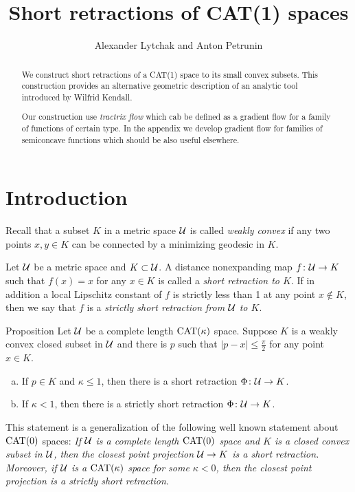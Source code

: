 \documentclass[oneside,a4paper, 12pt]{article}
\begin{document}
\title{Short retractions of CAT(1) spaces}
\author{Alexander Lytchak and Anton Petrunin}
\date{}
\maketitle

\begin{abstract}
We construct short retractions of a CAT(1) space to its small convex subsets.
This construction provides an alternative geometric description of an analytic tool introduced by Wilfrid Kendall.

Our construction use \emph{tractrix flow} which cab be defined as a gradient flow for a family of functions of certain type.
In the appendix we develop gradient flow for families of semiconcave functions which should be also useful elsewhere.
\end{abstract}


\section{Introduction}


Recall that a  subset $K$ in a metric space ${\mathcal{U}}$ is called \emph{weakly convex} if any two points $x,y\in K$ can be connected by a minimizing geodesic in $K$.

Let ${\mathcal{U}}$ be a metric space and $K\subset {\mathcal{U}}$.
A distance nonexpanding map $f\colon{\mathcal{U}}\to K$ such that $f(x)=x$ for any $x\in K$ is called a \emph{short retraction to $K$}.
If in addition a local Lipschitz constant of $f$ is strictly less than 1 at any point $x\notin K$, 
then we say that $f$ is a \emph{strictly short retraction from ${\mathcal{U}}$ to $K$}.

\begin{thm}{Proposition}\label{thm:retraction:Phi}
Let $\mathcal{U}$ be a complete length $\mathrm{CAT}(\kappa)$ space.
Suppose $K$ is a weakly convex closed subset in $\mathcal{U}$ and there is $p$ such that $|p-x|\le \tfrac\pi2$ for any point $x\in K$.


\begin{enumerate}[(a)]
 \item If $p\in K$ and $\kappa\le 1$, then there is a short retraction 
$\Phi\colon\mathcal{U}\to K$.
\item If $\kappa<1$, then there is a strictly short retraction 
$\Phi\colon\mathcal{U}\to K$.
\end{enumerate}
\end{thm}

This statement is a generalization of the following well known statement about $\mathrm{CAT}(0)$ spaces:
\emph{If ${\mathcal{U}}$ is a complete length $\mathrm{CAT}(0)$ space and $K$ is a closed convex subset in ${\mathcal{U}}$,
then the closest point projection ${\mathcal{U}}\to K$ is a short retraction.
Moreover, if $\mathcal{U}$ is a $\mathrm{CAT}(\kappa)$ space for some $\kappa<0$, then  the closest point projection is a strictly short retraction}.
\end{document}
